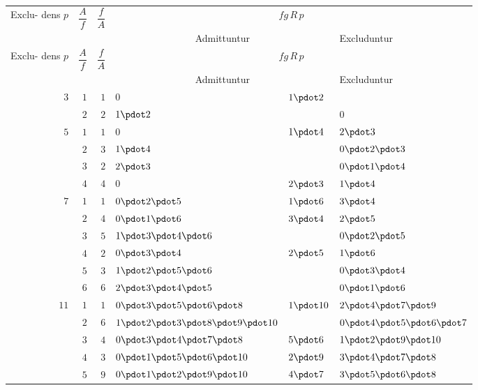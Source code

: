 \clearpage
\begingroup\fontsize{8.3}{9.2}\selectfont\setlength{\tabcolsep}{2pt}\renewcommand{\arraystretch}{1.00}
\begin{longtable}{r|r|r|p{113pt}|p{29pt}|p{120pt}}
\hline
\shortstack{Exclu-\\dens\\$p$} & $\dfrac{A}{f}$ & $\dfrac{f}{A}$ & \multicolumn{3}{c}{$fg\,R\,p$}\\\cline{4-6}
& & & \multicolumn{2}{c|}{Admittuntur} & Excluduntur\\\hline
\endfirsthead
\shortstack{Exclu-\\dens\\$p$} & $\dfrac{A}{f}$ & $\dfrac{f}{A}$ & \multicolumn{3}{c}{$fg\,R\,p$}\\\cline{4-6}
& & & \multicolumn{2}{c|}{Admittuntur} & Excluduntur\\\hline
\endhead
$3$ & $1$ & $1$ & $0$ & $1\pdot 2$ & \\
 & $2$ & $2$ & $1\pdot 2$ &  & $0$\\
$5$ & $1$ & $1$ & $0$ & $1\pdot 4$ & $2\pdot 3$\\
 & $2$ & $3$ & $1\pdot 4$ &  & $0\pdot 2\pdot 3$\\
 & $3$ & $2$ & $2\pdot 3$ &  & $0\pdot 1\pdot 4$\\
 & $4$ & $4$ & $0$ & $2\pdot 3$ & $1\pdot 4$\\
$7$ & $1$ & $1$ & $0\pdot 2\pdot 5$ & $1\pdot 6$ & $3\pdot 4$\\
 & $2$ & $4$ & $0\pdot 1\pdot 6$ & $3\pdot 4$ & $2\pdot 5$\\
 & $3$ & $5$ & $1\pdot 3\pdot 4\pdot 6$ &  & $0\pdot 2\pdot 5$\\
 & $4$ & $2$ & $0\pdot 3\pdot 4$ & $2\pdot 5$ & $1\pdot 6$\\
 & $5$ & $3$ & $1\pdot 2\pdot 5\pdot 6$ &  & $0\pdot 3\pdot 4$\\
 & $6$ & $6$ & $2\pdot 3\pdot 4\pdot 5$ &  & $0\pdot 1\pdot 6$\\
$11$ & $1$ & $1$ & $0\pdot 3\pdot 5\pdot 6\pdot 8$ & $1\pdot 10$ & $2\pdot 4\pdot 7\pdot 9$\\
 & $2$ & $6$ & $1\pdot 2\pdot 3\pdot 8\pdot 9\pdot 10$ &  & $0\pdot 4\pdot 5\pdot 6\pdot 7$\\
 & $3$ & $4$ & $0\pdot 3\pdot 4\pdot 7\pdot 8$ & $5\pdot 6$ & $1\pdot 2\pdot 9\pdot 10$\\
 & $4$ & $3$ & $0\pdot 1\pdot 5\pdot 6\pdot 10$ & $2\pdot 9$ & $3\pdot 4\pdot 7\pdot 8$\\
 & $5$ & $9$ & $0\pdot 1\pdot 2\pdot 9\pdot 10$ & $4\pdot 7$ & $3\pdot 5\pdot 6\pdot 8$\\

\end{longtable}
